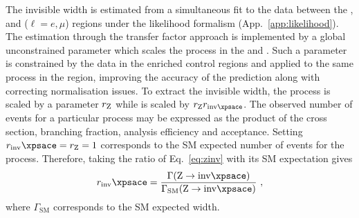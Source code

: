 The \PZ invisible width is estimated from a simultaneous fit to the data between the \metplusjets, \diellplusjets and \ellplusjets ($\ell=e,\mu$) regions under the likelihood formalism (App.~\ref{app:likelihood}). The \IWj estimation through the transfer factor approach is implemented by a global unconstrained parameter which scales the \IWj process in the \metplusjets and \ellplusjets. Such a parameter is constrained by the data in the \IWj enriched control regions and applied to the same process in the \metplusjets region, improving the accuracy of the prediction along with correcting normalisation issues. To extract the invisible width, the \IZllj process is scaled by a parameter $r_\mathrm{Z}$ while \IZvvj is scaled by $r_\PZ r_{\inv}$. The observed number of events for a particular process may be expressed as the product of the cross section, branching fraction, analysis efficiency and acceptance.  Setting $r_\inv=r_\PZ=1$ corresponds to the SM expected number of events for the process. Therefore, taking the ratio of Eq.~\ref{eq:zinv} with its SM expectation gives
%
\begin{equation}
    r_\inv = \frac{\Gamma(\PZ\ra\inv)}{\Gamma_{\mathrm{SM}}(\PZ\ra\inv)}\ ,
\end{equation}
%
where $\Gamma_{\mathrm{SM}}$ corresponds to the SM expected width.

